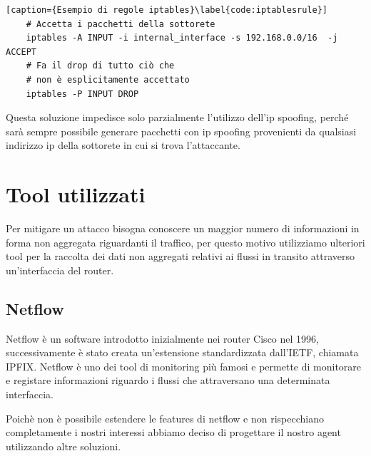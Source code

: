 \begin{lstlisting}[caption={Esempio di regole iptables}\label{code:iptablesrule}]
    # Accetta i pacchetti della sottorete
    iptables -A INPUT -i internal_interface -s 192.168.0.0/16  -j ACCEPT
    # Fa il drop di tutto ciò che
    # non è esplicitamente accettato
    iptables -P INPUT DROP
\end{lstlisting}
Questa soluzione impedisce solo parzialmente l'utilizzo dell'ip spoofing, perché sarà sempre possibile generare pacchetti con ip spoofing provenienti da qualsiasi indirizzo ip della sottorete in cui si trova l'attaccante.


\section{Tool utilizzati}

Per mitigare un attacco bisogna conoscere un maggior numero di informazioni in forma non aggregata riguardanti il traffico, per questo motivo utilizziamo ulteriori tool per la raccolta dei dati non aggregati relativi ai flussi in transito attraverso un'interfaccia del router.

\subsection{Netflow}

Netflow è un software introdotto inizialmente nei router Cisco nel 1996, successivamente è stato creata un'estensione standardizzata dall'IETF, chiamata IPFIX. Netflow è uno dei tool di monitoring più famosi e permette di monitorare e registare informazioni riguardo i flussi che attraversano una determinata interfaccia.





Poichè non è possibile estendere le features di netflow e non rispecchiano completamente i nostri interessi abbiamo deciso di progettare il nostro agent utilizzando altre soluzioni.

